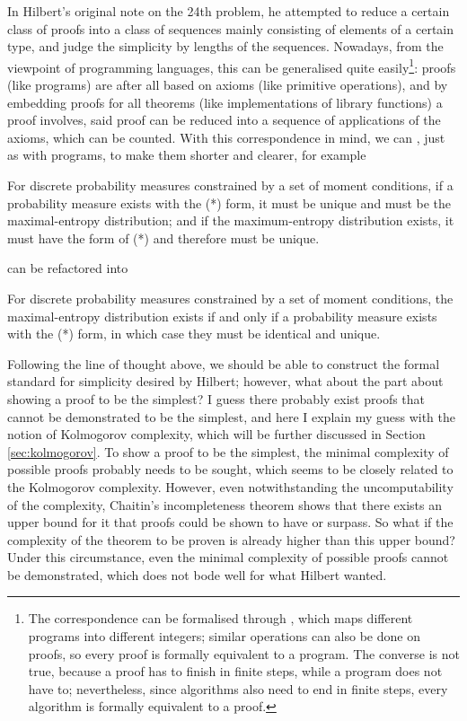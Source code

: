 In Hilbert's original note on the 24th problem, he attempted to reduce a certain
class of proofs into a class of sequences mainly consisting of elements of a
certain type, and judge the simplicity by lengths of the sequences.  Nowadays,
from the viewpoint of programming languages, this can be generalised quite
easily\footnote{The correspondence can be formalised through , which maps different programs into
different integers; similar operations can also be done on proofs, so every
proof is formally equivalent to a program.  The converse is not true, because
a proof has to finish in finite steps, while a program does not have to;
nevertheless, since algorithms also need to end in finite steps, every algorithm
is formally equivalent to a proof.}: proofs (like programs) are after all based
on axioms (like primitive operations), and by embedding proofs for all theorems
(like implementations of library functions) a proof involves, said proof can be
reduced into a sequence of applications of the axioms, which can be counted.
With this correspondence in mind, we can , just as with programs, to make them
shorter and clearer, for example
\begin{quoting}
	For discrete probability measures constrained by a set of moment
	conditions, if a probability measure exists with the (*) form,
	it must be unique and must be the maximal-entropy distribution;
	and if the maximum-entropy distribution exists, it must have
	the form of (*) and therefore must be unique.
\end{quoting}
can be refactored into
\begin{quoting}
	For discrete probability measures constrained by a set of
	moment conditions, the maximal-entropy distribution exists
	if and only if a probability measure exists with the (*) form,
	in which case they must be identical and unique.
\end{quoting}

Following the line of thought above, we should be able to construct the formal
standard for simplicity desired by Hilbert; however, what about the part about
showing a proof to be the simplest?  I guess there probably exist proofs that
cannot be demonstrated to be the simplest, and here I explain my guess with the
notion of Kolmogorov complexity, which will be further discussed in Section~%
\ref{sec:kolmogorov}.  To show a proof to be the simplest, the minimal complexity
of possible proofs probably needs to be sought, which seems to be closely
related to the Kolmogorov complexity.  However, even notwithstanding the
uncomputability of the complexity, Chaitin's incompleteness theorem shows
that there exists an upper bound for it that proofs could be shown to have
or surpass.  So what if the complexity of the theorem to be proven is
already higher than this upper bound?  Under this circumstance, even
the minimal complexity of possible proofs cannot be demonstrated,
which does not bode well for what Hilbert wanted.

